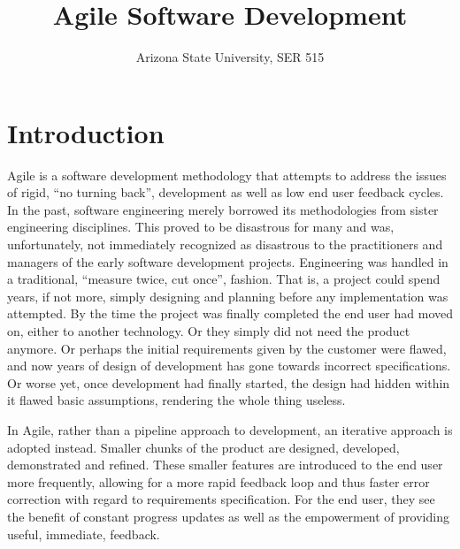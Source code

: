 \documentclass{report}
\title{Agile Software Development}
\author{Arizona State University, SER 515}
\begin{document}
\maketitle
{}

\section{Introduction}
Agile is a software development methodology that attempts to address the issues of rigid, “no turning back”, development as well as low end user feedback cycles. In the past, software engineering merely borrowed its methodologies from sister engineering disciplines. This proved to be disastrous for many and was, unfortunately, not immediately recognized as disastrous to the practitioners and managers of the early software development projects. Engineering was handled in a traditional, “measure twice, cut once”, fashion. That is, a project could spend years, if not more, simply designing and planning before any implementation was attempted. By the time the project was finally completed the end user had moved on, either to another technology. Or they simply did not need the product anymore. Or perhaps the initial requirements given by the customer were flawed, and now years of design of development has gone towards incorrect specifications. Or worse yet, once development had finally started, the design had hidden within it flawed basic assumptions, rendering the whole thing useless.

In Agile, rather than a pipeline approach to development, an iterative approach is adopted instead. Smaller chunks of the product are designed, developed, demonstrated and refined. These smaller features are introduced to the end user more frequently, allowing for a more rapid feedback loop and thus faster error correction with regard to requirements specification. For the end user, they see the benefit of constant progress updates as well as the empowerment of providing useful, immediate, feedback.
\end{document}
